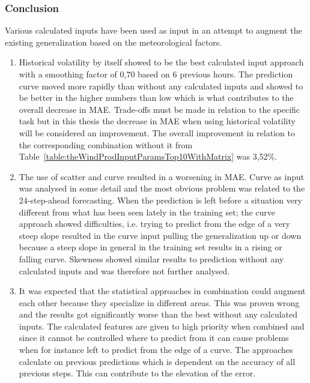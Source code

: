 \subsubsection{Conclusion}
Various calculated inputs have been used as input in an attempt to augment the existing generalization based on the meteorological factors. 

\begin{enumerate}
\item Historical volatility by itself showed to be the best calculated input approach with a smoothing factor of 0,70 based on 6 previous hours. The prediction curve moved more rapidly than without any calculated inputs and showed to be better in the higher numbers than low which is what contributes to the overall decrease in MAE. Trade-offs must be made in relation to the specific task but in this thesis the decrease in MAE when using historical volatility will be considered an improvement. The overall improvement in relation to the corresponding combination without it from Table~\ref{table:theWindProdInputParamsTop10WithMatrix} was 3,52\%.
\item The use of scatter and curve resulted in a worsening in MAE. Curve as input was analysed in some detail and the most obvious problem was related to the 24-step-ahead forecasting. When the prediction is left before a situation very different from what has been seen lately in the training set; the curve approach showed difficulties, i.e. trying to predict from the edge of a very steep slope resulted in the curve input pulling the generalization up or down because a steep slope in general in the training set results in a rising or falling curve. Skewness showed similar results to prediction without any calculated inputs and was therefore not further analysed.
\item It was expected that the statistical approaches in combination could augment each other because they specialize in different areas. This was proven wrong and the results got significantly worse than the best without any calculated inputs. The calculated features are given to high priority when combined and since it cannot be controlled where to predict from it can cause problems when for instance left to predict from the edge of a curve. The approaches calculate on previous predictions which is dependent on the accuracy of all previous steps. This can contribute to the elevation of the error.
\end{enumerate}

\newpage

